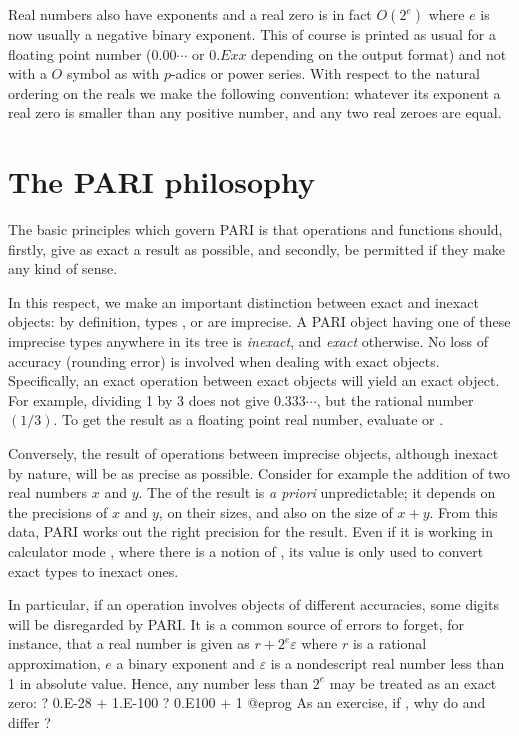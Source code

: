Real numbers also have exponents and a real zero is in fact $O(2^e)$ where
$e$ is now usually a negative binary exponent. This of course is printed as
usual for a floating point number ($0.00\cdots$ or $0.Exx$ depending on the
output format) and not with a $O$ symbol as with $p$-adics or power series.
With respect to the natural ordering on the reals we make the following
convention: whatever its exponent a real zero is smaller than any positive
number, and any two real zeroes are equal.

\section{The PARI philosophy}
The basic principles which govern PARI is that operations and functions
should, firstly, give as exact a result as possible, and secondly, be
permitted if they make any kind of sense.

In this respect, we make an important distinction between exact and inexact
objects: by definition, types ,  or  are
imprecise. A PARI object having one of these imprecise types anywhere in
its tree is \emph{inexact}, and \emph{exact} otherwise. No loss of accuracy
(rounding error) is involved when dealing with exact objects. Specifically,
an exact operation between exact objects will yield an exact object. For
example, dividing 1 by 3 does not give $0.333\cdots$, but the rational number
$(1/3)$. To get the result as a floating point real number, evaluate
 or .

Conversely, the result of operations between imprecise objects, although
inexact by nature, will be as precise as possible. Consider for example the
addition of two real numbers $x$ and $y$. The  of the result is
\emph{a priori} unpredictable; it depends on the precisions of $x$ and $y$,
on their sizes, and also on the size of $x+y$. From this data, PARI works out
the right precision for the result. Even if it is working in calculator mode
, where there is a notion of , its value is
only used to convert exact types to inexact ones.

In particular, if an operation involves objects of different accuracies, some
digits will be disregarded by PARI. It is a common source of errors to
forget, for instance, that a real number is given as $r + 2^e \varepsilon$
where $r$ is a rational approximation, $e$ a binary exponent and
$\varepsilon$ is a nondescript real number less than 1 in absolute value.
Hence, any number less than $2^e$ may be treated as an exact zero:
\bprog
? 0.E-28 + 1.E-100
? 0.E100 + 1
@eprog
\noindent As an exercise, if , why do  and
 differ ?

